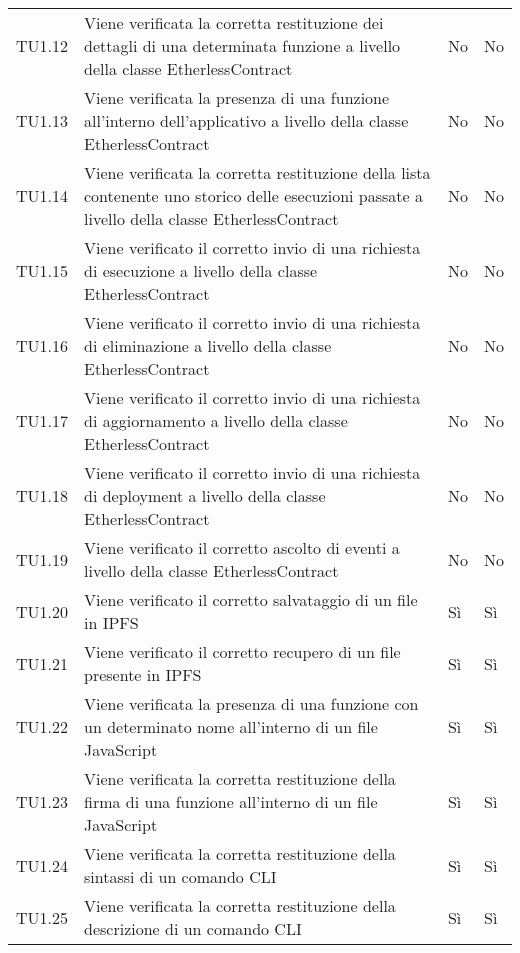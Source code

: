 \begin{longtable}{
		>{\centering}p{}
		>{}p{}
		>{\centering}p{}
		>{\centering}p{} }
		TU1.12 &
		Viene verificata la corretta restituzione dei dettagli di una determinata funzione a livello della classe EtherlessContract &
		No &
		No \tabularnewline

		TU1.13 &
		Viene verificata la presenza di una funzione all’interno dell’applicativo a livello della classe EtherlessContract &
		No &
		No \tabularnewline

		TU1.14 &
		Viene verificata la corretta restituzione della lista contenente uno storico delle esecuzioni passate a livello della classe EtherlessContract &
		No &
		No \tabularnewline

		TU1.15 &
		Viene verificato il corretto invio di una richiesta di esecuzione a livello della classe EtherlessContract &
		No &
		No \tabularnewline

		TU1.16 &
		Viene verificato il corretto invio di una richiesta di eliminazione a livello della classe EtherlessContract &
		No &
		No \tabularnewline

		TU1.17 &
		Viene verificato il corretto invio di una richiesta di aggiornamento a livello della classe EtherlessContract &
		No &
		No \tabularnewline

		TU1.18 &
		Viene verificato il corretto invio di una richiesta di deployment a livello della classe EtherlessContract &
		No &
		No \tabularnewline

		TU1.19 &
		Viene verificato il corretto ascolto di eventi a livello della classe EtherlessContract &
		No &
		No \tabularnewline

		TU1.20 &
		Viene verificato il corretto salvataggio di un file in IPFS &
		Sì &
		Sì \tabularnewline

		TU1.21 &
		Viene verificato il corretto recupero di un file presente in IPFS &
		Sì &
		Sì \tabularnewline

		TU1.22 &
		Viene verificata la presenza di una funzione con un determinato nome all’interno di un file JavaScript &
		Sì &
		Sì \tabularnewline

		TU1.23 &
		Viene verificata la corretta restituzione della firma di una funzione all’interno di un file JavaScript &
		Sì &
		Sì \tabularnewline

		TU1.24 &
		Viene verificata la corretta restituzione della sintassi di un comando CLI &
		Sì &
		Sì \tabularnewline

		TU1.25 &
		Viene verificata la corretta restituzione della descrizione di un comando CLI &
		Sì &
		Sì \tabularnewline
		











\end{longtable}
